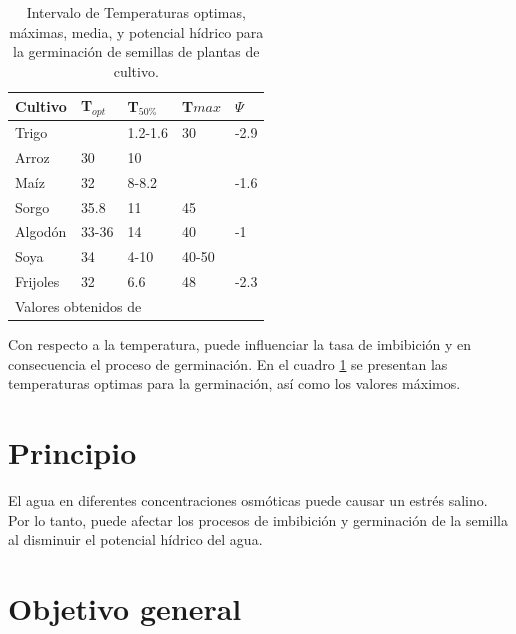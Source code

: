 \begin{table}[h]
	\caption{Intervalo de Temperaturas optimas, m\'aximas, media, y potencial h\'idrico para la germinaci\'on de semillas de plantas de cultivo.}
	\label{tabla:germinacion}
	\begin{tabular}{p{}p{}p{}p{}p{}}
		\hline
		Cultivo & T$_{opt}$ & T$_{50\%}$ & T$max$  & $\Psi$ \\ %
		\hline
		Trigo &   & 1.2-1.6 & 30 & -2.9 \\
		
		Arroz & 30 & 10 &  &  \\

		Ma\'iz & 32 & 8-8.2  &   & -1.6 \\

		Sorgo & 35.8 & 11 & 45 &  \\
		
		Algod\'on & 33-36 & 14 & 40  & -1 \\
		
		Soya & 34 & 4-10 & 40-50 &  \\
		
		Frijoles & 32 & 6.6 & 48 & -2.3 \\
		\hline
		\multicolumn{5}{l}{\footnotesize Valores obtenidos de \citet{drr2014lrag}}
	\end{tabular}
\end{table}

Con respecto a la temperatura, puede influenciar la tasa de imbibici\'on y en consecuencia el proceso de germinaci\'on. En el cuadro \ref{tabla:germinacion} se presentan las temperaturas optimas para la germinaci\'on, as\'i como los valores m\'aximos. 

\section{Principio}

El agua en diferentes concentraciones osm\'oticas puede causar un estr\'es salino. Por lo tanto, puede afectar los procesos de imbibici\'on y germinaci\'on de la semilla al disminuir el potencial h\'idrico del agua. 




\section{Objetivo general}

